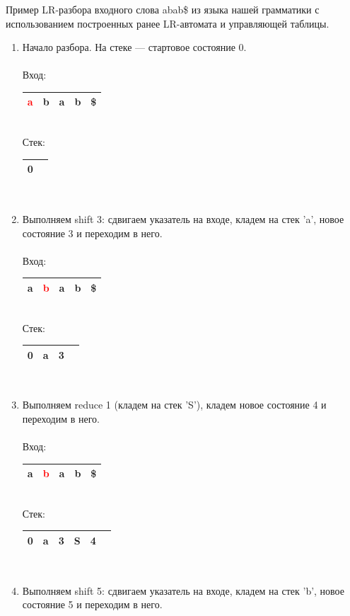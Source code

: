 \begin{example}
Пример LR-разбора входного слова abab\$ из языка нашей грамматики с использованием построенных ранее LR-автомата и управляющей таблицы.
\begin{enumerate}
\item Начало разбора. На стеке --- стартовое состояние 0. \\ \\
Вход: \,
\begin{tabular}[c]{ |c|c|c|c|c| }
    \hline \textcolor{red}{a} & b & a & b & \$ \\ \hline
\end{tabular} \\
Стек: \,
\begin{tabular}[c]{ |c|c }
    \hline 0 & \\ \hline
\end{tabular}
\\
\item Выполняем shift 3: сдвигаем указатель на входе, кладем на стек 'a', новое состояние 3 и переходим в него. \\ \\
Вход: \,
\begin{tabular}[c]{ |c|c|c|c|c| }
    \hline a & \textcolor{red}{b} & a & b & \$ \\ \hline
\end{tabular} \\
Стек: \,
\begin{tabular}[c]{ |c|c|c|c }
    \hline 0 & a & 3 & \\ \hline
\end{tabular}
\\
\item Выполняем reduce 1 (кладем на стек 'S'), кладем новое состояние 4 и переходим в него. \\ \\
Вход: \,
\begin{tabular}[c]{ |c|c|c|c|c| }
    \hline a & \textcolor{red}{b} & a & b & \$ \\ \hline
\end{tabular} \\
Стек: \,
\begin{tabular}[c]{ |c|c|c|c|c|c }
    \hline 0 & a & 3 & S & 4 & \\ \hline
\end{tabular}
\\
\item Выполняем shift 5: сдвигаем указатель на входе, кладем на стек 'b', новое состояние 5 и переходим в него. \\ \\

\end{enumerate}
\end{example}
